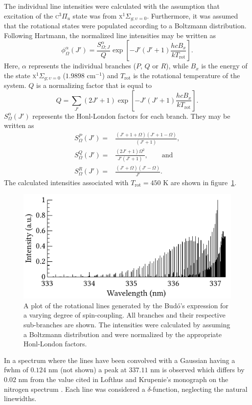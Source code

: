 The individual line intensities were calculated with the assumption that
excitation of the \textsc{c}$^3\Pi_u$ state was from
\textsc{x}$^1\Sigma_{g;\upsilon=0}$. Furthermore, it was assumed that the
rotational states were populated according to a Boltzmann distribution.
Following Hartmann, the normalized line intensities may be written as
\begin{equation}
    \phi^\alpha_{\Omega}(J') = \frac{S^\alpha_{\Omega;J}}{Q}
        \exp{\left[ -J'(J' + 1)\frac{hcB_x}{kT_{\mathrm{rot}}}\right]}.
\end{equation}
Here, $\alpha$ represents the individual branches ($P$, $Q$ or $R$), while $B_x$
is the energy of the state \textsc{x}$^1\Sigma_{g;\upsilon=0}$ ($1.9898$
cm$^{-1}$) and $T_\mathrm{rot}$ is the rotational temperature of the system. $Q$
is a normalizing factor that is equal to
\begin{equation}
   Q = \sum_{J'}{(2J' + 1)\exp{\left[-J'(J' + 1) 
                               \frac{hcB_x}{kT_\mathrm{rot}}\right]}}.
\end{equation}
$S^\alpha_{\Omega}(J')$ represents the Honl-London factors for each branch. They
may be written as
\begin{align}
    S^P_{\Omega}(J') = & \frac{(J' + 1 + \Omega)(J' + 1 - \Omega)} {(J' + 1)}, \\
    S^Q_{\Omega}(J') = & \frac{(2J' + 1)\Omega^2}{J'(J' + 1)}, \qquad \textrm{and} \\
    S^R_{\Omega}(J') = & \frac{(J' + \Omega)(J' - \Omega)}{J'}.
\end{align}
The calculated intensities associated with $T_\mathrm{rot}=450$ K are shown in
figure~\ref{fig:lines}.
\begin{figure}
  \centering
  \includegraphics{./chapters/nasa/figures/lines.pdf}
  \caption{A plot of the rotational lines generated by the Bud\'{o}'s expression
    for a varying degree of spin-coupling. All branches and their respective
    sub-branches are shown. The intensities were calculated by assuming a Boltzmann
    distribution and were normalized by the appropriate Honl-London factors.}
  \label{fig:lines}
\end{figure}
In a spectrum where the lines have been convolved with a Gaussian having a
\acs{fwhm} of $0.124$ nm (not shown) a peak at $337.11$ nm is observed which
differs by $0.02$ nm from the value cited in Lofthus and Krupenie's monograph on
the nitrogen spectrum \cite{Lofthus1977}. Each line was considered a
$\delta$-function, neglecting the natural linewidths.

